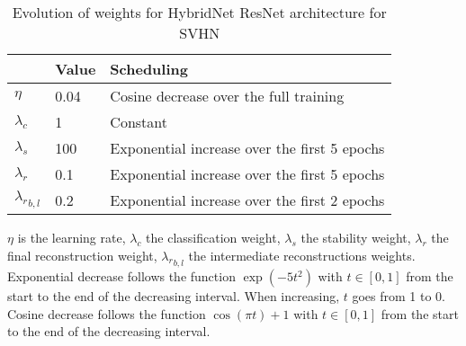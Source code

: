 \documentclass[runningheads]{llncs}
\begin{document}
\begin{table}[htbp]
\centering
\caption{Evolution of weights for HybridNet ResNet architecture for SVHN}
\label{tab:resnetschedsvhn}
\begin{threeparttable}
\setlength{\tabcolsep}{4pt}
\begin{tabular}{ l l l}
\toprule
 & Value & Scheduling \\
\midrule
$\eta$ & 0.04 & Cosine decrease over the full training \\
$\lambda_c$ & 1 & Constant \\
$\lambda_s$ & 100 & Exponential increase over the first 5 epochs \\
$\lambda_r$ & 0.1 & Exponential increase over the first 5 epochs \\
${\lambda_r}_{b,l}$ & 0.2 & Exponential increase over the first 2 epochs \\
\bottomrule
\end{tabular}
\begin{tablenotes}
$\eta$ is the learning rate, $\lambda_c$ the classification weight, $\lambda_s$ the stability weight, $\lambda_r$ the final reconstruction weight, ${\lambda_r}_{b,l}$ the intermediate reconstructions weights.\\
Exponential decrease follows the function $\exp(-5t^2)$ with $t\in[0,1]$ from the start to the end of the decreasing interval. When increasing, $t$ goes from 1 to 0.\\
Cosine decrease follows the function $\cos(\pi t)+1$ with $t\in[0,1]$ from the start to the end of the decreasing interval.
\end{tablenotes}
\end{threeparttable}
\end{table}
\end{document}
